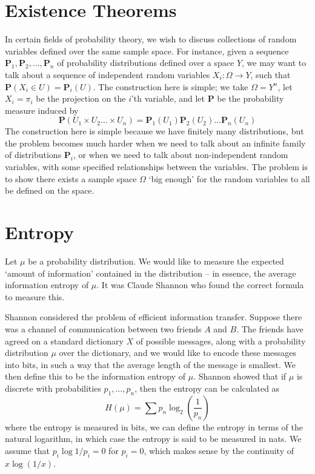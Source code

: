 \chapter{Existence Theorems}

In certain fields of probability theory, we wish to discuss collections of random variables defined over the same sample space. For instance, given a sequence $\mathbf{P}_1, \mathbf{P}_2, \dots, \mathbf{P}_n$ of probability distributions defined over a space $Y$, we may want to talk about a sequence of independent random variables $X_i: \Omega \to Y$, such that $\mathbf{P}(X_i \in U) = \mathbf{P}_i(U)$. The construction here is simple; we take $\Omega = Y^n$, let $X_i = \pi_i$ be the projection on the $i$'th variable, and let $\mathbf{P}$ be the probability measure induced by
%
\[ \mathbf{P}(U_1 \times U_2 \dots \times U_n) = \mathbf{P}_1(U_1) \mathbf{P}_2(U_2) \dots \mathbf{P}_n(U_n) \]
%
The construction here is simple because we have finitely many distributions, but the problem becomes much harder when we need to talk about an infinite family of distributions $\mathbf{P}_i$, or when we need to talk about non-independent random variables, with some specified relationships between the variables. The problem is to show there exists a sample space $\Omega$ `big enough' for the random variables to all be defined on the space.

\chapter{Entropy}

Let $\mu$ be a probability distribution. We would like to measure the expected `amount of information' contained in the distribution -- in essence, the average information entropy of $\mu$. It was Claude Shannon who found the correct formula to measure this.

Shannon considered the problem of efficient information transfer. Suppose there was a channel of communication between two friends $A$ and $B$. The friends have agreed on a standard dictionary $X$ of possible messages, along with a probability distribution $\mu$ over the dictionary, and we would like to encode these messages into bits, in such a way that the average length of the message is smallest. We then define this to be the information entropy of $\mu$. Shannon showed that if $\mu$ is discrete with probabilities $p_1, \dots, p_n$, then the entropy can be calculated as
%
\[ H(\mu) = \sum p_n \log_2 \left( \frac{1}{p_n} \right) \]
%
where the entropy is measured in bits, we can define the entropy in terms of the natural logarithm, in which case the entropy is said to be measured in nats. We assume that $p_i \log 1/p_i = 0$ for $p_i = 0$, which makes sense by the continuity of $x \log (1/x)$.

